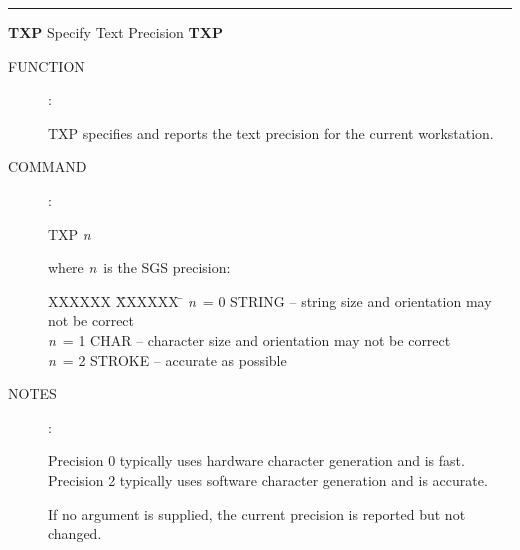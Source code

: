 
\goodbreak
\rule{\textwidth}{0.3mm}
{\Large {\bf TXP} \hfill Specify Text Precision \hfill {\bf TXP}}
\begin{description}
\item [FUNCTION]:

TXP specifies and reports the text precision
for the current workstation.

\item [COMMAND]:

\begin{cmd}
\> \> TXP {\it n}
\end{cmd}

where {\it n}\, is the SGS precision:

\begin{tabs}
XXXXXX \= XXXXXX \= \kill
\> {\it n}\, = 0 \> STRING -- string size and orientation may not be correct \\
\> {\it n}\, = 1 \> CHAR -- character size and orientation may not be correct \\
\> {\it n}\, = 2 \> STROKE -- accurate as possible
\end{tabs}

\item [NOTES]:

Precision 0 typically uses hardware character generation and is
fast.  Precision 2 typically uses software character generation
and is accurate.

If no argument is supplied, the current precision is reported
but not changed.

\end{description}


